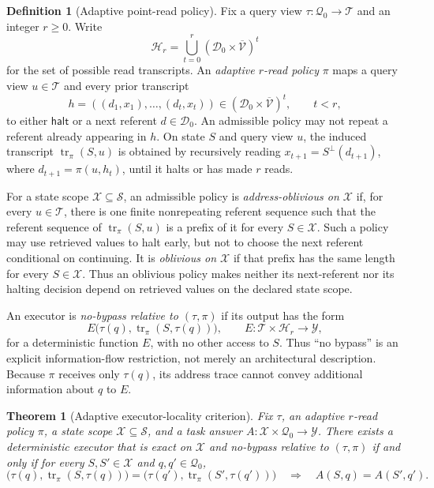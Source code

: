 \documentclass[11pt]{article}
\theoremstyle{definition}
\newtheorem{definition}{Definition}
\theoremstyle{plain}
\newtheorem{theorem}{Theorem}
\newcommand{\Dom}{\mathcal{D}}
\newcommand{\Qu}{\mathcal{Q}}
\newcommand{\Va}{\mathcal{V}}
\newcommand{\bt}{\bot}
\begin{document}
\begin{definition}[Adaptive point-read policy]\label{def:policy}
Fix a query view \(\tau:\Qu_0\to\mathcal T\) and an integer \(r\geq0\).
Write
\[
 \mathcal H_r=\bigcup_{t=0}^{r}(\Dom_0\times\overline{\Va})^t
\]
for the set of possible read transcripts.  An \emph{adaptive \(r\)-read
policy} \(\pi\) maps a query view \(u\in\mathcal T\) and every
prior transcript
\[
 h=((d_1,x_1),\ldots,(d_t,x_t))
 \in(\Dom_0\times\overline{\Va})^t,\qquad t<r,
\]
to either \(\mathsf{halt}\) or a next referent \(d\in\Dom_0\).  An admissible
policy may not repeat a referent already appearing in \(h\).  On state \(S\)
and query view \(u\), the induced transcript
\(\operatorname{tr}_{\pi}(S,u)\) is obtained by recursively reading
\(x_{t+1}=S^{\bt}(d_{t+1})\), where
\(d_{t+1}=\pi(u,h_t)\), until it halts or has made \(r\) reads.

For a state scope \(\mathcal X\subseteq\mathcal S\), an admissible policy
is \emph{address-oblivious on \(\mathcal X\)} if, for every
\(u\in\mathcal T\), there is one finite nonrepeating referent sequence such
that the referent sequence of \(\operatorname{tr}_{\pi}(S,u)\) is a prefix
of it for every \(S\in\mathcal X\).  Such a policy may use retrieved values
to halt early, but not to choose the next referent conditional on continuing.
It is \emph{oblivious on \(\mathcal X\)} if that prefix has the same length
for every \(S\in\mathcal X\).  Thus an oblivious policy makes neither its
next-referent nor its halting decision depend on retrieved values on the
declared state scope.

An executor is \emph{no-bypass relative to \((\tau,\pi)\)} if its output has
the form
\[
 E\bigl(\tau(q),\operatorname{tr}_{\pi}(S,\tau(q))\bigr),
 \qquad E:\mathcal T\times\mathcal H_r\to\mathcal Y,
\]
for a deterministic function \(E\), with no other access to \(S\).  Thus
``no bypass'' is an explicit information-flow restriction, not merely an
architectural description.  Because \(\pi\) receives only \(\tau(q)\), its
address trace cannot convey additional information about \(q\) to \(E\).
\end{definition}

\begin{theorem}[Adaptive executor-locality criterion]\label{thm:locality}
Fix \(\tau\), an adaptive \(r\)-read policy \(\pi\), a state scope
\(\mathcal X\subseteq\mathcal S\), and a task answer
\(A:\mathcal X\times\Qu_0\to\mathcal Y\).  There exists a deterministic
executor that is exact on \(\mathcal X\) and no-bypass relative to
\((\tau,\pi)\) if and only if for every \(S,S'\in\mathcal X\) and
\(q,q'\in\Qu_0\),
\[
 \bigl(\tau(q),\operatorname{tr}_{\pi}(S,\tau(q))\bigr)
 =\bigl(\tau(q'),\operatorname{tr}_{\pi}(S',\tau(q'))\bigr)
 \quad\Longrightarrow\quad A(S,q)=A(S',q'). \tag{L}
\]
\end{theorem}
\end{document}
